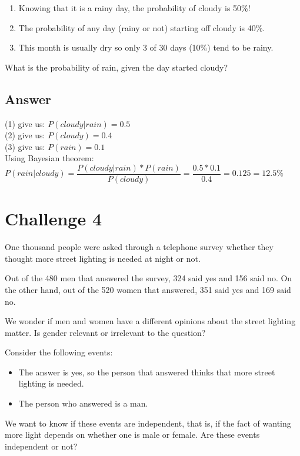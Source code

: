 \documentclass[a4paper]{article} %
\begin{document}
\begin{enumerate}
    \item Knowing that it is a rainy day, the probability of cloudy is 50\%!
    \item The probability of any day (rainy or not) starting off cloudy is 40\%.
    \item This month is usually dry so only 3 of 30 days (10\%) tend to be rainy.
\end{enumerate}

What is the probability of rain, given the day started cloudy?

\subsection*{Answer}
(1) give us: $P(cloudy|rain) = 0.5$ \\
(2) give us: $P(cloudy) = 0.4$ \\
(3) give us: $P(rain) = 0.1$ \\

Using Bayesian theorem:
$P(rain|cloudy) = \dfrac{P(cloudy|rain)*P(rain)}{P(cloudy)} = \dfrac{0.5*0.1}{0.4} = 0.125 = 12.5\%$

\bigskip

\section{Challenge 4}
One thousand people were asked through a telephone survey whether they thought more street lighting is needed at night or not.

Out of the 480 men that answered the survey, 324 said yes and 156 said no. On the other hand, out of the 520 women that answered, 351 said yes and 169 said no.

We wonder if men and women have a different opinions about the street lighting matter. Is gender relevant or irrelevant to the question?

Consider the following events:
\begin{itemize}
    \item The answer is yes, so the person that answered thinks that more street lighting is needed.
    \item The person who answered is a man.
\end{itemize}

We want to know if these events are independent, that is, if the fact of wanting more light depends on whether one is male or female. Are these events independent or not?
\end{document}
